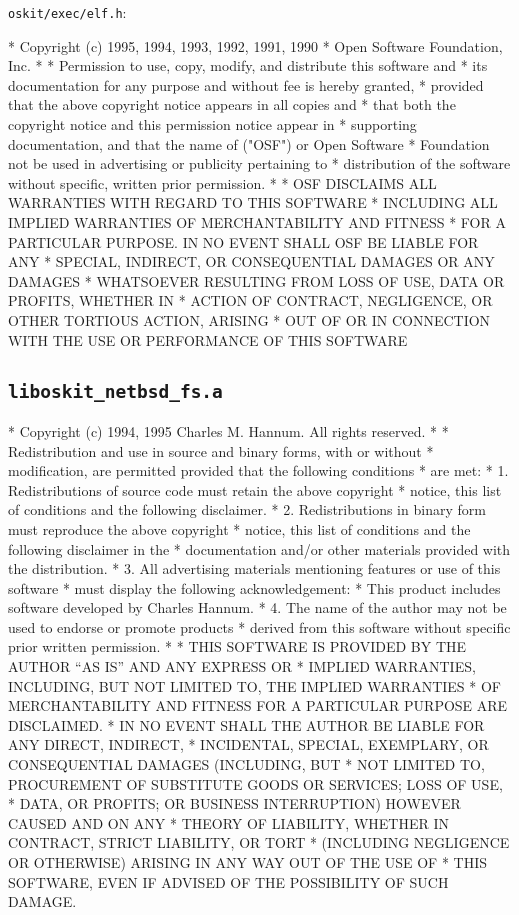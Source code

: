 \texttt{oskit/\-exec/\-elf.h}:

\begin{copyrightEnv}
 * Copyright (c) 1995, 1994, 1993, 1992, 1991, 1990
 * Open Software Foundation, Inc.
 *
 * Permission to use, copy, modify, and distribute this software and
 * its documentation for any purpose and without fee is hereby granted,
 * provided that the above copyright notice appears in all copies and
 * that both the copyright notice and this permission notice appear in
 * supporting documentation, and that the name of ("OSF") or Open Software
 * Foundation not be used in advertising or publicity pertaining to
 * distribution of the software without specific, written prior permission.
 *
 * OSF DISCLAIMS ALL WARRANTIES WITH REGARD TO THIS SOFTWARE
 * INCLUDING ALL IMPLIED WARRANTIES OF MERCHANTABILITY AND FITNESS
 * FOR A PARTICULAR PURPOSE. IN NO EVENT SHALL OSF BE LIABLE FOR ANY
 * SPECIAL, INDIRECT, OR CONSEQUENTIAL DAMAGES OR ANY DAMAGES
 * WHATSOEVER RESULTING FROM LOSS OF USE, DATA OR PROFITS, WHETHER IN
 * ACTION OF CONTRACT, NEGLIGENCE, OR OTHER TORTIOUS ACTION, ARISING
 * OUT OF OR IN CONNECTION WITH THE USE OR PERFORMANCE OF THIS SOFTWARE
\end{copyrightEnv}

\subsection{\texttt{liboskit_netbsd_fs.a}}
\begin{copyrightEnv}
 * Copyright (c) 1994, 1995 Charles M. Hannum.  All rights reserved.
 *
 * Redistribution and use in source and binary forms, with or without
 * modification, are permitted provided that the following conditions
 * are met:
 * 1. Redistributions of source code must retain the above copyright
 *    notice, this list of conditions and the following disclaimer.
 * 2. Redistributions in binary form must reproduce the above copyright
 *    notice, this list of conditions and the following disclaimer in the
 *    documentation and/or other materials provided with the distribution.
 * 3. All advertising materials mentioning features or use of this software
 *    must display the following acknowledgement:
 *      This product includes software developed by Charles Hannum.
 * 4. The name of the author may not be used to endorse or promote products
 *    derived from this software without specific prior written permission.
 *
 * THIS SOFTWARE IS PROVIDED BY THE AUTHOR ``AS IS'' AND ANY EXPRESS OR
 * IMPLIED WARRANTIES, INCLUDING, BUT NOT LIMITED TO, THE IMPLIED WARRANTIES
 * OF MERCHANTABILITY AND FITNESS FOR A PARTICULAR PURPOSE ARE DISCLAIMED.
 * IN NO EVENT SHALL THE AUTHOR BE LIABLE FOR ANY DIRECT, INDIRECT,
 * INCIDENTAL, SPECIAL, EXEMPLARY, OR CONSEQUENTIAL DAMAGES (INCLUDING, BUT
 * NOT LIMITED TO, PROCUREMENT OF SUBSTITUTE GOODS OR SERVICES; LOSS OF USE,
 * DATA, OR PROFITS; OR BUSINESS INTERRUPTION) HOWEVER CAUSED AND ON ANY
 * THEORY OF LIABILITY, WHETHER IN CONTRACT, STRICT LIABILITY, OR TORT
 * (INCLUDING NEGLIGENCE OR OTHERWISE) ARISING IN ANY WAY OUT OF THE USE OF
 * THIS SOFTWARE, EVEN IF ADVISED OF THE POSSIBILITY OF SUCH DAMAGE.
\end{copyrightEnv}

